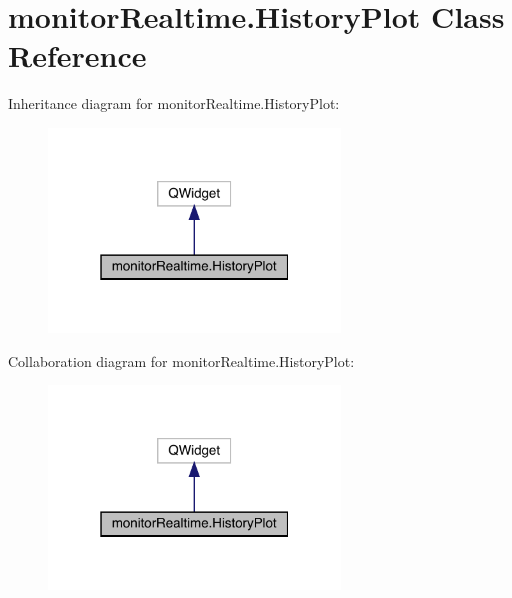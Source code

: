 \hypertarget{classmonitor_realtime_1_1_history_plot}{}\section{monitor\+Realtime.\+History\+Plot Class Reference}
\label{classmonitor_realtime_1_1_history_plot}


Inheritance diagram for monitor\+Realtime.\+History\+Plot\+:\nopagebreak
\begin{figure}[H]
\begin{center}
\leavevmode
\includegraphics[width=220pt]{classmonitor_realtime_1_1_history_plot__inherit__graph}
\end{center}
\end{figure}


Collaboration diagram for monitor\+Realtime.\+History\+Plot\+:\nopagebreak
\begin{figure}[H]
\begin{center}
\leavevmode
\includegraphics[width=220pt]{classmonitor_realtime_1_1_history_plot__coll__graph}
\end{center}
\end{figure}
